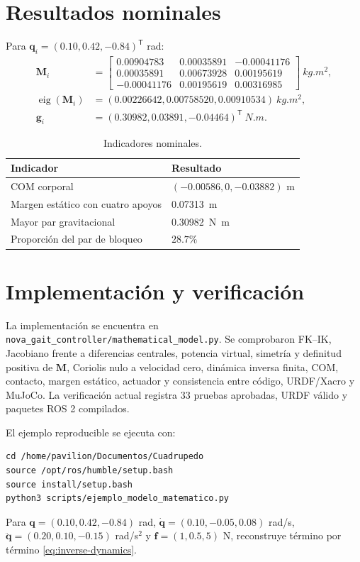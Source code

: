\documentclass[11pt,letterpaper]{article}
\newcommand{\vect}[1]{\bm{#1}}
\newcommand{\mat}[1]{\bm{#1}}
\newcommand{\trans}{^{\mathsf T}}
\begin{document}
\section{Resultados nominales}
Para $\vect q_i=(0.10,0.42,-0.84)\trans$ rad:
\begin{align}
\mat M_i&=\begin{bmatrix}
0.00904783&0.00035891&-0.00041176\\
0.00035891&0.00673928&0.00195619\\
-0.00041176&0.00195619&0.00316985
\end{bmatrix}\ \si{kg.m^2},\\
\operatorname{eig}(\mat M_i)&=(0.00226642,0.00758520,0.00910534)\ \si{kg.m^2},\\
\vect g_i&=(0.30982,0.03891,-0.04464)\trans\ \si{N.m}.
\end{align}
\begin{table}[ht]\centering\caption{Indicadores nominales.}
\begin{tabular}{ll}\toprule Indicador&Resultado\\\midrule
COM corporal&$(-0.00586,0,-0.03882)$ m\\
Margen estático con cuatro apoyos&\SI{0.07313}{m}\\
Mayor par gravitacional&\SI{0.30982}{N.m}\\
Proporción del par de bloqueo&$28.7\%$\\\bottomrule
\end{tabular}\end{table}

\section{Implementación y verificación}
La implementación se encuentra en
\texttt{nova\_gait\_controller/mathematical\_model.py}. Se comprobaron FK--IK,
Jacobiano frente a diferencias centrales, potencia virtual, simetría y
definitud positiva de $\mat M$, Coriolis nulo a velocidad cero, dinámica
inversa finita, COM, contacto, margen estático, actuador y consistencia entre
código, URDF/Xacro y MuJoCo. La verificación actual registra 33 pruebas aprobadas,
URDF válido y paquetes ROS 2 compilados.

El ejemplo reproducible se ejecuta con:
\begin{verbatim}
cd /home/pavilion/Documentos/Cuadrupedo
source /opt/ros/humble/setup.bash
source install/setup.bash
python3 scripts/ejemplo_modelo_matematico.py
\end{verbatim}
Para $\vect q=(0.10,0.42,-0.84)$ rad,
$\dot{\vect q}=(0.10,-0.05,0.08)$ rad/s,
$\ddot{\vect q}=(0.20,0.10,-0.15)$ rad/s$^2$ y
$\vect f=(1,0.5,5)$ N, reconstruye término por término \cref{eq:inverse-dynamics}.
\end{document}
